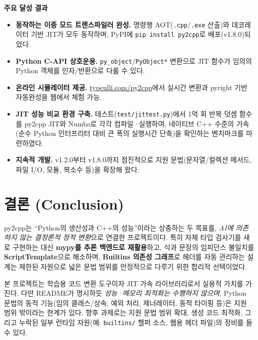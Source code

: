 \documentclass[10pt]{article}
\begin{document}
\textbf{주요 달성 결과}
\begin{itemize}
  \item \textbf{동작하는 이중 모드 트랜스파일러 완성.} 명령행 AOT(\texttt{.cpp}/\texttt{.exe} 산출)와 데코레이터 기반 JIT가 모두 동작하며, PyPI에 \texttt{pip install py2cpp}로 배포(v1.8.0)되었다.
  \item \textbf{Python C-API 상호운용.} \texttt{py\_object}/\texttt{PyObject*} 변환으로 JIT 함수가 임의의 Python 객체를 인자/반환으로 다룰 수 있다.
  \item \textbf{온라인 시뮬레이터 제공.} \href{https://typeulli.com/py2cpp}{typeulli.com/py2cpp}에서 실시간 변환과 pyright 기반 자동완성을 웹에서 체험 가능.
  \item \textbf{JIT 성능 비교 환경 구축.} 테스트(\texttt{test/jittest.py})에서 1억 회 반복 덧셈 함수를 py2cpp JIT와 Numba로 각각 컴파일·실행하여, 네이티브 C++ 수준의 가속(순수 Python 인터프리터 대비 큰 폭의 실행시간 단축)을 확인하는 벤치마크를 마련하였다.
  \item \textbf{지속적 개발.} v1.2.0부터 v1.8.0까지 점진적으로 지원 문법(문자열/컬렉션 메서드, 파일 I/O, 모듈, 복소수 등)을 확장해 왔다.
\end{itemize}

\section{결론 (Conclusion)}
py2cpp는 ``Python의 생산성과 C++의 성능''이라는 상충하는 두 목표를, \emph{AI에 의존하지 않는 결정론적 정적 변환}으로 연결한 프로젝트이다. 특히 자체 타입 검사기를 새로 구현하는 대신 \textbf{mypy를 추론 백엔드로 재활용}하고, 식과 문장의 임피던스 불일치를 \textbf{ScriptTemplate}으로 해소하며, \textbf{Builtins 의존성 그래프}로 헤더를 자동 관리하는 설계는 제한된 자원으로 넓은 문법 범위를 안정적으로 다루기 위한 합리적 선택이었다.

본 프로젝트는 학습용 코드 변환 도구이자 JIT 가속 라이브러리로서 실용적 가치를 가진다. 다만 README가 명시하듯 \emph{성능·메모리 최적화는 수행하지 않으며}, Python 문법의 동적 기능(임의 클래스/상속, 예외 처리, 제너레이터, 동적 타이핑 등)은 지원 범위 밖이라는 한계가 있다. 향후 과제로는 지원 문법 범위 확대, 생성 코드 최적화, 그리고 누락된 일부 런타임 자원(예: \texttt{builtins/} 헬퍼 소스, 웹용 헤더 파일)의 정비를 들 수 있다.

\end{document}
